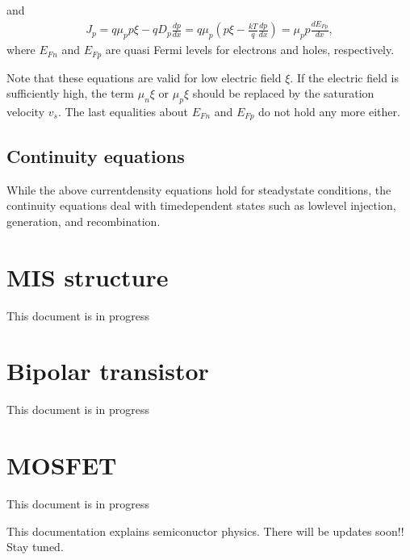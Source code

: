 \documentclass[letterpaper,10pt,english]{sphinxmanual}
\numberwithin{equation}{section}
\begin{document}
\sphinxAtStartPar
and
\begin{equation}\label{equation:Basic_equation:hole_current_quasi_fermi}
\begin{split}J_p = q\mu_pp\xi - qD_p\frac{dp}{dx} = q\mu_p\left(p\xi - \frac{kT}{q}\frac{dp}{dx}\right) = \mu_pp\frac{dE_{Fp}}{dx},\end{split}
\end{equation}
\sphinxAtStartPar
where \(E_{Fn}\) and \(E_{Fp}\) are quasi Fermi levels for electrons and holes, respectively.

\sphinxAtStartPar
Note that these equations are valid for low electric field \(\xi\).
If the electric field is sufficiently high, the term \(\mu_n\xi\) or \(\mu_p\xi\) should be replaced by the saturation velocity \(v_s\).
The last equalities about \(E_{Fn}\) and \(E_{Fp}\) do not hold any more either.


\subsection{Continuity equations}
\label{\detokenize{Basic_equation:continuity-equations}}
\sphinxAtStartPar
While the above current\sphinxhyphen{}density equations hold for steady\sphinxhyphen{}state conditions, the continuity equations deal with time\sphinxhyphen{}dependent states such as low\sphinxhyphen{}level injection, generation, and recombination.

\sphinxstepscope


\section{MIS structure}
\label{\detokenize{MIS_structure:mis-structure}}\label{\detokenize{MIS_structure::doc}}
\sphinxAtStartPar
This document is in progress

\sphinxstepscope


\section{Bipolar transistor}
\label{\detokenize{Bipolar_transistor:bipolar-transistor}}\label{\detokenize{Bipolar_transistor::doc}}
\sphinxAtStartPar
This document is in progress

\sphinxstepscope


\section{MOSFET}
\label{\detokenize{MOSFET:mosfet}}\label{\detokenize{MOSFET::doc}}
\sphinxAtStartPar
This document is in progress

\sphinxAtStartPar
This documentation explains semiconuctor physics.
There will be updates soon!!
Stay tuned.

\sphinxAtStartPar
{}



\renewcommand{\indexname}{Index}
\printindex
\end{document}
